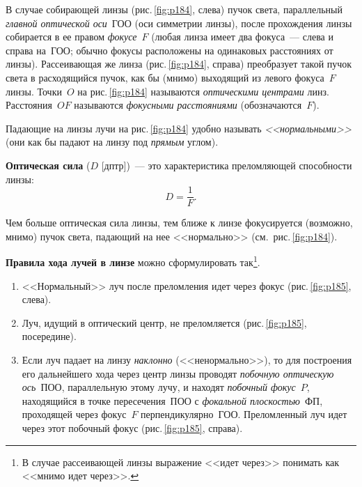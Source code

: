 \documentclass[main.tex]{subfiles}
\begin{document}
В случае собирающей линзы (рис.\,\ref{fig:p184}, слева) пучок света, параллельный \emph{главной оптической оси}~ГОО (оси симметрии линзы), после прохождения линзы собирается в ее правом \emph{фокусе}~$F$ (любая линза имеет два фокуса~--- слева и справа на~ГОО; обычно фокусы расположены на одинаковых расстояниях от линзы). Рассеивающая же линза (рис.\,\ref{fig:p184}, справа) преобразует такой пучок света в расходящийся пучок, как бы (мнимо) выходящий из левого фокуса~$F$ линзы. Точки~$O$ на рис.\,\ref{fig:p184} называются \emph{оптическими центрами} линз. Расстояния~$OF$ называются \emph{фокусными расстояниями} (обозначаются~$F$).

Падающие на линзы лучи на рис.\,\ref{fig:p184} удобно называть \emph{<<нормальными>>} (они как бы падают на линзу под \emph{прямым} углом).

\textbf{Оптическая сила} ($D$ [дптр])~--- это характеристика преломляющей способности линзы:
\begin{equation}
    D=\frac{1}{F}.
\end{equation}

Чем больше оптическая сила линзы, тем ближе к линзе фокусируется (возможно, мнимо) пучок света, падающий на нее <<нормально>> (см.~рис.\,\ref{fig:p184}).

\textbf{Правила хода лучей в линзе} можно сформулировать так\footnote{В случае рассеивающей линзы выражение <<идет через>> понимать как <<мнимо идет через>>.}. 
\begin{enumerate}
    \item <<Нормальный>> луч после преломления идет через фокус (рис.\,\ref{fig:p185}, слева).
    \item Луч, идущий в оптический центр, не преломляется (рис.\,\ref{fig:p185}, посередине).
    \item Если луч падает на линзу \emph{наклонно} (<<ненормально>>), то для построения его дальнейшего хода через центр линзы проводят \emph{побочную оптическую ось}~ПОО, параллельную этому лучу, и находят \emph{побочный фокус~$P$}, находящийся в точке пересечения~ПОО с \emph{фокальной плоскостью}~ФП, проходящей через фокус~$F$ перпендикулярно~ГОО. Преломленный луч идет через этот побочный фокус (рис.\,\ref{fig:p185}, справа). 
\end{enumerate}
\nointerlineskip
\end{document}
